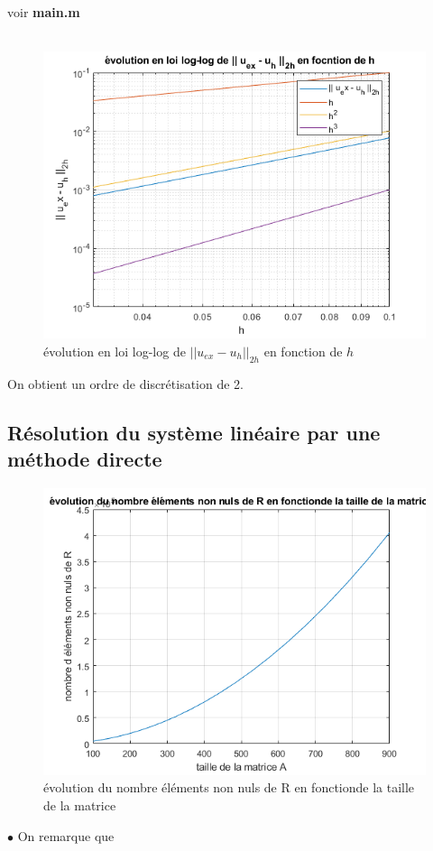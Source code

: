 \documentclass{article}
\begin{document}
voir \textbf{main.m} \\ \\ 

\begin{figure}[H]
\centering
\includegraphics[width=12cm]{loglog.png}
\caption{évolution en loi log-log de $|| u_{ex} - u_h ||_{2h}$ en fonction de $h$}
\end{figure}
On obtient un ordre de discrétisation de 2.


\subsection{Résolution du système linéaire par une méthode directe}
\begin{figure}[H]
\centering
\includegraphics[width=12cm]{nonzero.png}
\caption{évolution du nombre éléments non nuls de R en fonctionde la taille de la matrice}
\end{figure}
$\bullet$ On remarque que 
\end{document}
